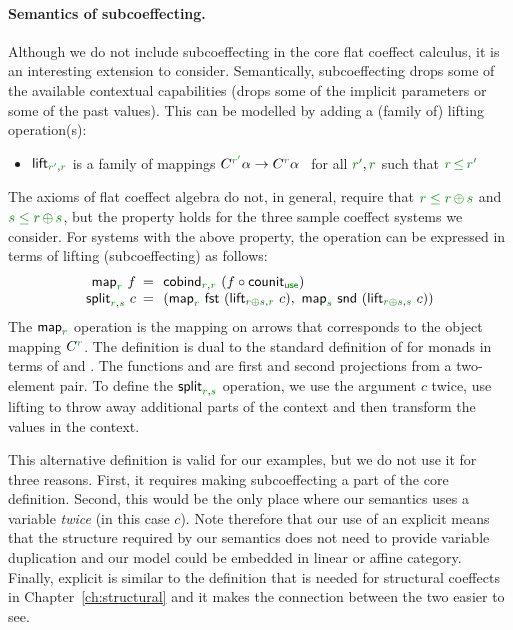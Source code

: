 \paragraph{Semantics of subcoeffecting.}
Although we do not include subcoeffecting in the core flat coeffect calculus, it is an interesting
extension to consider. Semantically, subcoeffecting drops some of the available contextual
capabilities (drops some of the implicit parameters or some of the past values). This can be
modelled by adding a (family of) lifting operation(s):
%
\begin{itemize}
 \item $\ident{lift}_{\cclrd{r'},\cclrd{r}}$ is a family of mappings
   $\ctyp{\cclrd{r'}}{\alpha} \rightarrow \ctyp{\cclrd{r}}{\alpha}$~ for all $\cclrd{r'}, \cclrd{r}$ such that $\cclrd{r}\,\cleq\,\cclrd{r'}$
\end{itemize}
%
The axioms of flat coeffect algebra do not, in general, require that
$\cclrd{r} \;\cleq\; \cclrd{r}\,\cpar\,\cclrd{s}$ and $\cclrd{s} \;\cleq\; \cclrd{r}\,\cpar\,\cclrd{s}$,
but the property holds for the three sample coeffect systems we consider. For systems with
the above property, the  operation can be expressed in terms of lifting
(subcoeffecting) as follows:
%
\begin{equation*}
\begin{array}{rcl}
\ident{map}_{\cclrd{r}}~f &\narrow{=}& \ident{cobind}_{\cclrd{r}, \cclrd{r}}~(f\circ\ident{counit}_{\cunit}) \\
\ident{split}_{\cclrd{r}, \cclrd{s}}~c &\narrow{=}&
  ( \ident{map}_{\cclrd{r}}~\ident{fst}~(\ident{lift}_{\cclrd{r}\cpar\cclrd{s}, \cclrd{r}}~c),~
    \ident{map}_{\cclrd{s}}~\ident{snd}~(\ident{lift}_{\cclrd{r}\cpar\cclrd{s}, \cclrd{s}}~c) )
\end{array}
\end{equation*}
%
The $\ident{map}_{\cclrd{r}}$ operation is the mapping on arrows that corresponds to the object
mapping $\ctyp{\cclrd{r}}{}$. The definition is dual to the standard definition of 
for monads in terms of  and . The functions  and 
are first and second projections from a two-element pair. To define the
$\ident{split}_{\cclrd{r}, \cclrd{s}}$ operation, we use the argument $c$ twice, use lifting
to throw away additional parts of the context and then transform the values in the
context.

This alternative definition is valid for our examples, but we do not use it for three reasons. First,
it requires making subcoeffecting a part of the core definition. Second, this would be the only
place where our semantics uses a variable \emph{twice} (in this case $c$). Note therefore that
our use of an explicit  means that the structure required by our semantics does not
need to provide variable duplication and our model could be embedded in linear or affine category.
Finally, explicit  is similar to the definition that is needed for structural coeffects
in Chapter~\ref{ch:structural} and it makes the connection between the two easier to see.

